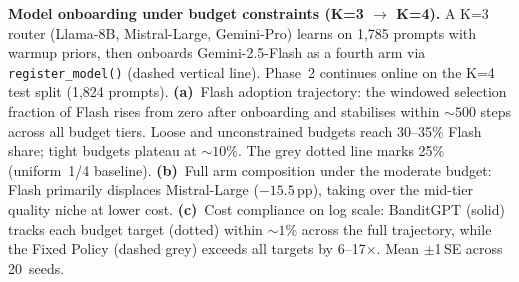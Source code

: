 
\textbf{Model onboarding under budget constraints (K=3 $\to$ K=4).}
A K=3 router (Llama-8B, Mistral-Large, Gemini-Pro) learns on 1{,}785
prompts with warmup priors, then onboards Gemini-2.5-Flash as a fourth arm
via \texttt{register\_model()} (dashed vertical line).
Phase~2 continues online on the K=4 test split (1{,}824 prompts).
\textbf{(a)}~Flash adoption trajectory: the windowed selection fraction
of Flash rises from zero after onboarding and stabilises within
${\sim}500$ steps across all budget tiers. Loose and unconstrained
budgets reach 30--35\% Flash share; tight budgets plateau at
${\sim}10$\%.
The grey dotted line marks 25\% (uniform~1/4 baseline).
\textbf{(b)}~Full arm composition under the moderate budget: Flash
primarily displaces Mistral-Large ($-15.5$\,pp), taking over the
mid-tier quality niche at lower cost.
\textbf{(c)}~Cost compliance on log scale: BanditGPT (solid) tracks
each budget target (dotted) within ${\sim}1$\% across the full
trajectory, while the Fixed Policy (dashed grey) exceeds all targets
by 6--17$\times$.
Mean $\pm$1\,SE across 20~seeds.
